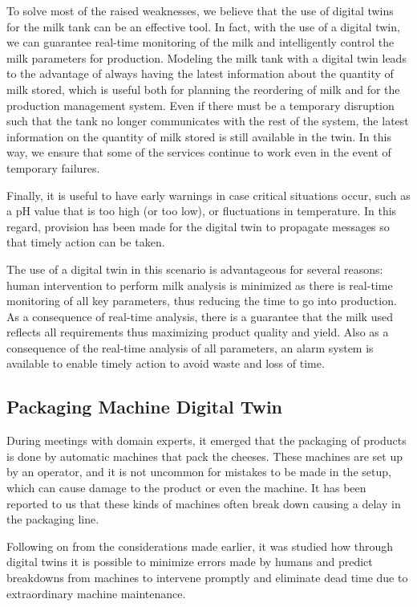 To solve most of the raised weaknesses, we believe that the use of digital twins for the milk tank can be an effective tool.
In fact, with the use of a digital twin, we can guarantee real-time monitoring of the milk and intelligently control the milk parameters for 
production.
Modeling the milk tank with a digital twin leads to the advantage of always having the latest information about the quantity of milk stored,
which is useful both for planning the reordering of milk and for the production management system.
Even if there must be a temporary disruption such that the tank no longer communicates with the rest of the system,
the latest information on the quantity of milk stored is still available in the twin.
In this way, we ensure that some of the services continue to work even in the event of temporary failures.

Finally, it is useful to have early warnings in case critical situations occur, such as a pH value that is too high (or too low), or fluctuations in
temperature.
In this regard, provision has been made for the digital twin to propagate messages so that timely action can be taken.

The use of a digital twin in this scenario is advantageous for several reasons: human intervention to perform milk analysis is minimized as there is
real-time monitoring of all key parameters, thus reducing the time to go into production.
As a consequence of real-time analysis, there is a guarantee that the milk used reflects all requirements thus maximizing product quality and yield.
Also as a consequence of the real-time analysis of all parameters, an alarm system is available to enable timely action to avoid waste and loss of time.

\subsection{Packaging Machine Digital Twin}
During meetings with domain experts, it emerged that the packaging of products is done by automatic machines that pack the cheeses.
These machines are set up by an operator, and it is not uncommon for mistakes to be made in the setup, which can cause damage to the product or even
the machine. It has been reported to us that these kinds of machines often break down causing a delay in the packaging line.

Following on from the considerations made earlier, it was studied how through digital twins it is possible to minimize errors made by humans and
predict breakdowns from machines to intervene promptly and eliminate dead time due to extraordinary machine maintenance.

